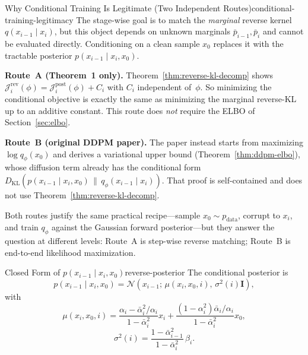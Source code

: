 \documentclass[11pt,a4paper]{article}
\newcommand{\cN}{\mathcal{N}}
\newcommand{\KL}[2]{D_{\mathrm{KL}}\!\left(#1\,\|\,#2\right)}
\newcommand{\balpha}{\bar{\alpha}}
\newcommand{\pdata}{p_{\mathrm{data}}}
\newcommand{\bpMarg}[1]{\bar p_{#1}}
\begin{document}
\begin{remark}{Why Conditional Training Is Legitimate (Two Independent Routes)}{conditional-training-legitimacy}
The stage-wise goal is to match the \emph{marginal} reverse kernel $q(x_{i-1}\mid x_i)$, but this object depends on unknown marginals $\bpMarg{i-1},\bpMarg{i}$ and cannot be evaluated directly.
Conditioning on a clean sample $x_0$ replaces it with the tractable posterior $p(x_{i-1}\mid x_i,x_0)$.

\textbf{Route~A (Theorem~1 only).}
Theorem~\ref{thm:reverse-kl-decomp} shows
$\mathcal{J}^{\mathrm{rev}}_i(\phi)=\mathcal{J}^{\mathrm{post}}_i(\phi)+C_i$ with $C_i$ independent of~$\phi$.
So minimizing the conditional objective is exactly the same as minimizing the marginal reverse-KL up to an additive constant.
This route does \emph{not} require the ELBO of Section~\ref{sec:elbo}.

\textbf{Route~B (original DDPM paper).}
The paper instead starts from maximizing $\log q_\phi(x_0)$ and derives a variational upper bound (Theorem~\ref{thm:ddpm-elbo}), whose diffusion term already has the conditional form $\KL{p(x_{i-1}\mid x_i,x_0)}{q_\phi(x_{i-1}\mid x_i)}$.
That proof is self-contained and does not use Theorem~\ref{thm:reverse-kl-decomp}.

Both routes justify the same practical recipe---sample $x_0\sim\pdata$, corrupt to $x_i$, and train $q_\phi$ against the Gaussian forward posterior---but they answer the question at different levels: Route~A is step-wise reverse matching; Route~B is end-to-end likelihood maximization.
\end{remark}

\begin{proposition}{Closed Form of \texorpdfstring{$p(x_{i-1}\mid x_i,x_0)$}{p(xi-1|xi,x0)}}{reverse-posterior}
The conditional posterior is
\[
p(x_{i-1}\mid x_i,x_0)
=\cN\!\left(x_{i-1};\,\mu(x_i,x_0,i),\,\sigma^2(i)\mathbf{I}\right),
\]
with
\[
\mu(x_i,x_0,i)
=\frac{\alpha_i-\balpha_i^2/\alpha_i}{1-\balpha_i^2}x_i
+\frac{(1-\alpha_i^2)\balpha_i/\alpha_i}{1-\balpha_i^2}x_0,
\]
\[
\sigma^2(i)
=\frac{1-\balpha_{i-1}^2}{1-\balpha_i^2}\,\beta_i.
\]
\end{proposition}
\end{document}
